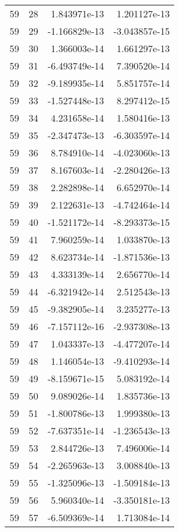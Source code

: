 \begin{tabular}{rrrr}
  59 &   28 &  1.843971e-13 &  1.201127e-13 \\
  59 &   29 & -1.166829e-13 & -3.043857e-15 \\
  59 &   30 &  1.366003e-14 &  1.661297e-13 \\
  59 &   31 & -6.493749e-14 &  7.390520e-14 \\
  59 &   32 & -9.189935e-14 &  5.851757e-14 \\
  59 &   33 & -1.527448e-13 &  8.297412e-15 \\
  59 &   34 &  4.231658e-14 &  1.580416e-13 \\
  59 &   35 & -2.347473e-13 & -6.303597e-14 \\
  59 &   36 &  8.784910e-14 & -4.023060e-13 \\
  59 &   37 &  8.167603e-14 & -2.280426e-13 \\
  59 &   38 &  2.282898e-14 &  6.652970e-14 \\
  59 &   39 &  2.122631e-13 & -4.742464e-14 \\
  59 &   40 & -1.521172e-14 & -8.293373e-15 \\
  59 &   41 &  7.960259e-14 &  1.033870e-13 \\
  59 &   42 &  8.623734e-14 & -1.871536e-13 \\
  59 &   43 &  4.333139e-14 &  2.656770e-14 \\
  59 &   44 & -6.321942e-14 &  2.512543e-13 \\
  59 &   45 & -9.382905e-14 &  3.235277e-13 \\
  59 &   46 & -7.157112e-16 & -2.937308e-13 \\
  59 &   47 &  1.043337e-13 & -4.477207e-14 \\
  59 &   48 &  1.146054e-13 & -9.410293e-14 \\
  59 &   49 & -8.159671e-15 &  5.083192e-14 \\
  59 &   50 &  9.089026e-14 &  1.835736e-13 \\
  59 &   51 & -1.800786e-13 &  1.999380e-13 \\
  59 &   52 & -7.637351e-14 & -1.236543e-13 \\
  59 &   53 &  2.844726e-13 &  7.496006e-14 \\
  59 &   54 & -2.265963e-13 &  3.008840e-13 \\
  59 &   55 & -1.325096e-13 & -1.509184e-13 \\
  59 &   56 &  5.960340e-14 & -3.350181e-13 \\
  59 &   57 & -6.509369e-14 &  1.713084e-14 \\

\end{tabular}
